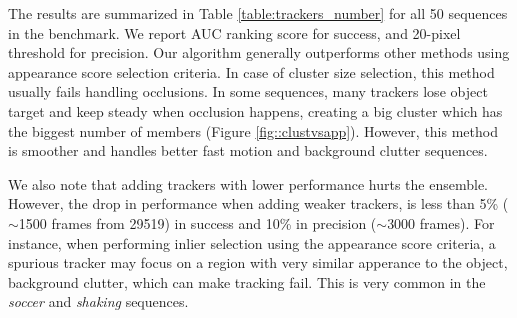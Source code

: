 \begin{table}[h!]
\centering
\caption{\small Average AUC and precision for inliers selection methods.}
\label{table:trackers_number}
\end{table}

The results are summarized in Table \ref{table:trackers_number} for all 50
sequences in the benchmark.
We report AUC ranking score for success, 
and 20-pixel threshold for precision.
%
%
Our algorithm generally outperforms other methods using
appearance score selection criteria. In case of cluster size selection,
this method usually fails handling occlusions. In some sequences, many trackers
lose object target and keep steady when occlusion happens, creating a big
cluster which has the biggest number of members (Figure \ref{fig::clustvsapp}).
However, this method is smoother and handles better fast motion and background
clutter sequences.



We also note that adding trackers with lower performance hurts the ensemble.
However, the drop in performance when adding
weaker trackers, is less than 5\% ($\sim$1500 frames from 29519) in success and 10\% in
precision ($\sim$3000 frames). For instance, when performing inlier selection using
the
appearance score criteria, a spurious tracker may focus on a region with
very similar apperance to the object, \eg background clutter, which can
make tracking fail.
This is very common in the \textit{soccer} and \textit{shaking}
sequences.

